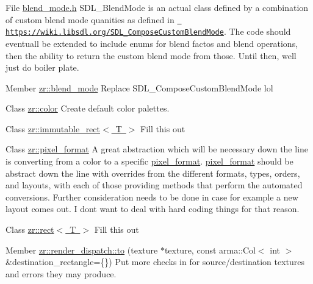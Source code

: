 
\begin{DoxyRefList}
\item[File \mbox{\hyperlink{blend__mode_8h}{blend\+\_\+mode.h}} ]\label{todo__todo000003}%
%
SDL\+\_\+\+Blend\+Mode is an actual class defined by a combination of custom blend mode quanities as defined in \href{https://wiki.libsdl.org/SDL_ComposeCustomBlendMode}{\texttt{ https\+://wiki.\+libsdl.\+org/\+SDL\+\_\+\+Compose\+Custom\+Blend\+Mode}}. The code should eventuall be extended to include enums for blend factos and blend operations, then the ability to return the custom blend mode from those. Until then, we\textquotesingle{}ll just do boiler plate.  
\item[Member \mbox{\hyperlink{blend__mode_8h_a5f8dcdda70c99298ce87c3c463cdf629}{zr\+::blend\+\_\+mode}} ]\label{todo__todo000004}%
%
Replace SDL\+\_\+\+Compose\+Custom\+Blend\+Mode lol  
\item[Class \mbox{\hyperlink{structzr_1_1color}{zr\+::color}} ]\label{todo__todo000005}%
%
Create default color palettes.  
\item[Class \mbox{\hyperlink{classzr_1_1immutable__rect}{zr\+::immutable\+\_\+rect\texorpdfstring{$<$}{<} T \texorpdfstring{$>$}{>}}} ]\label{todo__todo000001}%
%
Fill this out  
\item[Class \mbox{\hyperlink{classzr_1_1pixel__format}{zr\+::pixel\+\_\+format}} ]\label{todo__todo000006}%
%
A great abstraction which will be necessary down the line is converting from a color to a specific \mbox{\hyperlink{classzr_1_1pixel__format}{pixel\+\_\+format}}. \mbox{\hyperlink{classzr_1_1pixel__format}{pixel\+\_\+format}} should be abstract down the line with overrides from the different formats, types, orders, and layouts, with each of those providing methods that perform the automated conversions. Further consideration needs to be done in case for example a new layout comes out. I don\textquotesingle{}t want to deal with hard coding things for that reason. 
\item[Class \mbox{\hyperlink{classzr_1_1rect}{zr\+::rect\texorpdfstring{$<$}{<} T \texorpdfstring{$>$}{>}}} ]\label{todo__todo000002}%
%
Fill this out  
\item[Member \mbox{\hyperlink{classzr_1_1render__dispatch_a0dff1a725314e58b09172992b079e09c}{zr\+::render\+\_\+dispatch\+::to}} (texture $\ast$texture, const arma\+::\+Col$<$ int $>$ \&destination\+\_\+rectangle=\{\})]\label{todo__todo000007}%
%
Put more checks in for source/destination textures and errors they may produce. 




\end{DoxyRefList}
